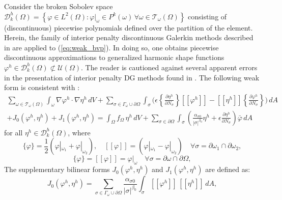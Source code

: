 	Consider the broken Sobolev space $\mathcal{D}^h_k (\Omega) = \left\{ \varphi \in L^2 (\Omega) : \varphi|_{\omega} \in P^k (\omega) \, \forall \omega \in \mathcal{T}_\omega (\Omega) \right\}$ consisting of (discontinuous) piecewise polynomials defined over the partition of the element. Herein, the family of interior penalty discontinuous Galerkin methods described in \cite{Riviere:08} are applied to (\ref{eq:weak_bvp}). In doing so, one obtains piecewise discontinuous approximations to generalized harmonic shape functions $\varphi^h \in \mathcal{D}^h_k (\Omega) \not\subset \mathcal{U} (\Omega)$. The reader is cautioned against several apparent errors in the presentation of interior penalty DG methods found in \cite{Riviere:08}. The following weak form is consistent with \cite{Riviere:01}:
	\begin{eqnarray}
		\sum_{\omega \in \mathcal{T}_\omega (\Omega)} \int_{\omega} \nabla \varphi^h \cdot \nabla \eta^h \, dV + \sum_{\sigma \in \Gamma_\omega \cup \partial \Omega} \int_{\sigma} \bigg( \epsilon \left\{ \frac{\partial \eta^h}{\partial N_{\sigma}} \right\} [\![ \varphi^h ]\!] - [\![ \eta^h ]\!] \left\{ \frac{\partial \varphi^h}{\partial N_{\sigma}} \right\}  \bigg) \, dA \nonumber \\ + J_0 (\varphi^h,\eta^h) + J_1 (\varphi^h,\eta^h) = \int_{\Omega} f_{\Omega} \, \eta^h \, dV + \sum_{\sigma \in \partial \Omega} \int_{\sigma} \left(\frac{\alpha_{\sigma0}}{|\sigma|^{\beta_0}} \eta^h + \epsilon \frac{\partial \eta^h}{\partial N_{\sigma}} \right) \bar{\varphi} \, dA
		\label{eq:dg_poisson}
	\end{eqnarray}
	for all $\eta^h \in \mathcal{D}^h_k (\Omega)$, where
	\begin{equation}
		\{ \varphi \} = \frac{1}{2} (\varphi|_{\omega_1} + \varphi|_{\omega_2}), \quad [\![ \varphi ]\!] = (\varphi|_{\omega_1} - \varphi|_{\omega_2}) \quad \forall \sigma = \partial \omega_1 \cap \partial \omega_2,
		\label{eq:internal_jumps}
	\end{equation}
	\begin{equation}
		\{ \varphi \} = [\![ \varphi ]\!] = \varphi|_{\omega} \quad \forall \sigma = \partial \omega \cap \partial \Omega,
		\label{eq:external_jumps}
	\end{equation}
	The supplementary bilinear forms $J_0 (\varphi^h,\eta^h)$ and $J_1 (\varphi^h,\eta^h)$ are defined as:
	\begin{equation}
		J_0 (\varphi^h,\eta^h) = \sum_{\sigma \in \Gamma_\omega \cup \partial \Omega} \frac{\alpha_{\sigma0}}{|\sigma|^{\beta_0}} \int_{\sigma} [\![ \varphi^h ]\!] \, [\![ \eta^h ]\!] \, dA,
	\end{equation}
